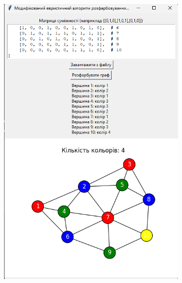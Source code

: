 \documentclass[12pt,a4paper]{article}
\begin{document}
\begin{figure}[htbp]
\begin{subfigure}{0.33\textwidth}
            \includegraphics[width=\linewidth]{ex1.png}
            \label{fig:b}
        \end{subfigure}


\end{figure}
\end{document}
